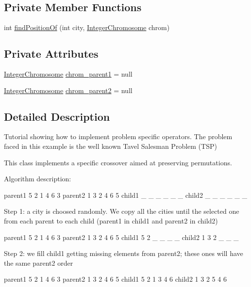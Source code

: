 \subsection*{Private Member Functions}
\begin{DoxyCompactItemize}
\item 
int \hyperlink{classjenes_1_1tutorials_1_1problem3_1_1_t_s_p_city_centered_crossover_a070b7ad69afad2bc97a6d8f31822ab96}{find\-Position\-Of} (int city, \hyperlink{classjenes_1_1chromosome_1_1_integer_chromosome}{Integer\-Chromosome} chrom)
\end{DoxyCompactItemize}
\subsection*{Private Attributes}
\begin{DoxyCompactItemize}
\item 
\hyperlink{classjenes_1_1chromosome_1_1_integer_chromosome}{Integer\-Chromosome} \hyperlink{classjenes_1_1tutorials_1_1problem3_1_1_t_s_p_city_centered_crossover_ad809abb1613db54c32389b8f826d298d}{chrom\-\_\-parent1} = null
\item 
\hyperlink{classjenes_1_1chromosome_1_1_integer_chromosome}{Integer\-Chromosome} \hyperlink{classjenes_1_1tutorials_1_1problem3_1_1_t_s_p_city_centered_crossover_a5a385a3e85a5cf8985d1f3dd7a28de7e}{chrom\-\_\-parent2} = null
\end{DoxyCompactItemize}


\subsection{Detailed Description}
Tutorial showing how to implement problem specific operators. The problem faced in this example is the well known Tavel Salesman Problem (T\-S\-P)

This class implements a specific crossover aimed at preserving permutations.

Algorithm description\-: 
\begin{DoxyPre}
      parent1  5 2 1 4 6 3     parent2   1 3 2 4 6 5
      child1   \_ \_ \_ \_ \_ \_     child2    \_ \_ \_ \_ \_ \_
\end{DoxyPre}
 Step 1\-: a city is choosed randomly. We copy all the cities until the selected one from each parent to each child (parent1 in child1 and parent2 in child2) 
\begin{DoxyPre}
      parent1  5 2 1 4 6 3     parent2   1 3 2 4 6 5
      child1   5 2 \_ \_ \_ \_     child2    1 3 2 \_ \_ \_
 \end{DoxyPre}
 Step 2\-: we fill child1 getting missing elements from parent2; these ones will have the same parent2 order 
\begin{DoxyPre}
      parent1  5 2 1 4 6 3     parent2  1 3 2 4 6 5
      child1   5 2 1 3 4 6     child2   1 3 2 5 4 6
\end{DoxyPre}


